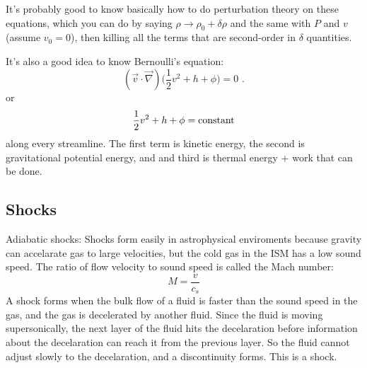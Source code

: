 It's probably good to know basically how to do perturbation theory on these equations, which you can do by saying $\rho \rightarrow \rho_0 + \delta \rho$ and the same with $P$ and $v$ (assume $v_0 = 0$), then killing all the terms that are second-order in $\delta$ quantities.

It's also a good idea to know Bernoulli's equation:
\begin{equation}
(\vec{v}\cdot \vec{\nabla})\biggl(\frac{1}{2} v^2 + h + \phi \biggr) = 0\,\, .
\end{equation}
or
\begin{equation}
\frac{1}{2} v^2 + h + \phi = {\rm constant}
\end{equation}
along every streamline. The first term is kinetic energy, the second is gravitational potential energy, and and third is thermal energy $+$ work that can be done.

\subsection{Shocks}
Adiabatic shocks:\newline
Shocks form easily in astrophysical enviroments because gravity can accelarate 
gas to large velocities, but the cold gas in the ISM has a low sound speed.  
The ratio of flow velocity to sound speed is called the Mach number:
\begin{equation}
\boxed{M=\frac{v}{c_s}}
\end{equation}
A shock forms when the bulk flow of a fluid is faster than the sound speed in the 
gas, and the gas is decelerated by another fluid.  Since the fluid is 
moving supersonically, the next layer of the fluid hits the decelaration before 
information about the decelaration can reach it from the previous layer.  So 
the fluid cannot adjust slowly to the decelaration, and a discontinuity forms.  
This is a shock.  

